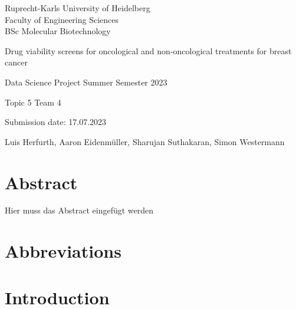 \documentclass[
  11pt,
]{article}
\author{}
\date{\vspace{-2.5em}}
\begin{document}
\begin{titlepage}
\centering
    {\Large Ruprecht-Karls University of Heidelberg\\
        Faculty of Engineering Sciences\\
        BSc Molecular Biotechnology\\}

    {}


        {\Huge Drug viability screens for oncological and non-oncological treatments for breast cancer}

        

    

    {\Large Data Science Project Summer Semester 2023}
    
    
    {\Large Topic 5 Team 4}

    
{\Large Submission date: 17.07.2023}


    {\Large
        Luis Herfurth, Aaron Eidenmüller, Sharujan Suthakaran, Simon Westermann  
}


\end{titlepage}

\newpage
\section*{Abstract}
Hier muss das Abstract eingefügt werden


\newpage
\tableofcontents

\newpage
\section*{Abbreviations}





\newpage
{}

\hypertarget{introduction}{%
\section{Introduction}\label{introduction}}
\end{document}
